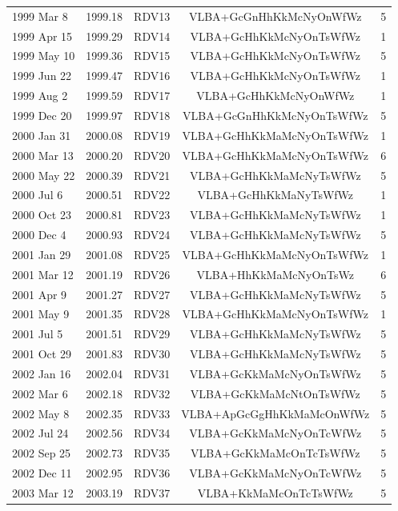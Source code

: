 \begin{table}[tbh!]
\begin{SingleSpace}
\begin{tabular}{lcccc}
1999 Mar 8  & 1999.18 & RDV13  & VLBA+GcGnHhKkMcNyOnWfWz   & 5   \\
1999 Apr 15 & 1999.29 & RDV14  & VLBA+GcHhKkMcNyOnTsWfWz   & 1   \\
1999 May 10 & 1999.36 & RDV15  & VLBA+GcHhKkMcNyOnTsWfWz   & 5   \\
1999 Jun 22 & 1999.47 & RDV16  & VLBA+GcHhKkMcNyOnTsWfWz   & 1   \\
1999 Aug 2  & 1999.59 & RDV17  & VLBA+GcHhKkMcNyOnWfWz     & 1   \\
1999 Dec 20 & 1999.97 & RDV18  & VLBA+GcGnHhKkMcNyOnTsWfWz & 5   \\
2000 Jan 31 & 2000.08 & RDV19  & VLBA+GcHhKkMaMcNyOnTsWfWz & 1   \\
2000 Mar 13 & 2000.20 & RDV20  & VLBA+GcHhKkMaMcNyOnTsWfWz & 6   \\
2000 May 22 & 2000.39 & RDV21  & VLBA+GcHhKkMaMcNyTsWfWz   & 5   \\
2000 Jul 6  & 2000.51 & RDV22  & VLBA+GcHhKkMaNyTsWfWz     & 1   \\
2000 Oct 23 & 2000.81 & RDV23  & VLBA+GcHhKkMaMcNyTsWfWz   & 1   \\
2000 Dec 4  & 2000.93 & RDV24  & VLBA+GcHhKkMaMcNyTsWfWz   & 5   \\
2001 Jan 29 & 2001.08 & RDV25  & VLBA+GcHhKkMaMcNyOnTsWfWz & 1   \\
2001 Mar 12 & 2001.19 & RDV26  & VLBA+HhKkMaMcNyOnTsWz     & 6   \\
2001 Apr 9  & 2001.27 & RDV27  & VLBA+GcHhKkMaMcNyTsWfWz   & 5   \\
2001 May 9  & 2001.35 & RDV28  & VLBA+GcHhKkMaMcNyOnTsWfWz & 1   \\
2001 Jul 5  & 2001.51 & RDV29  & VLBA+GcHhKkMaMcNyTsWfWz   & 5   \\
2001 Oct 29 & 2001.83 & RDV30  & VLBA+GcHhKkMaMcNyTsWfWz   & 5   \\
2002 Jan 16 & 2002.04 & RDV31  & VLBA+GcKkMaMcNyOnTsWfWz   & 5   \\
2002 Mar 6  & 2002.18 & RDV32  & VLBA+GcKkMaMcNtOnTsWfWz   & 5   \\
2002 May 8  & 2002.35 & RDV33  & VLBA+ApGcGgHhKkMaMcOnWfWz & 5   \\
2002 Jul 24 & 2002.56 & RDV34  & VLBA+GcKkMaMcNyOnTcWfWz   & 5   \\
2002 Sep 25 & 2002.73 & RDV35  & VLBA+GcKkMaMcOnTcTsWfWz   & 5   \\
2002 Dec 11 & 2002.95 & RDV36  & VLBA+GcKkMaMcNyOnTcWfWz   & 5   \\
2003 Mar 12 & 2003.19 & RDV37  & VLBA+KkMaMcOnTcTsWfWz     & 5   \\

\end{tabular}
\end{SingleSpace}
\end{table}
